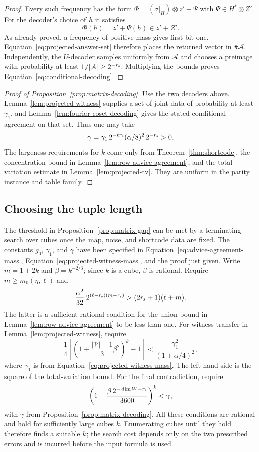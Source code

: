 \begin{proof}
Every such frequency has the form
$\Phi=(\sigma|_H)\otimes z'+\Psi$ with $\Psi\in H^*\otimes Z'$.
For the decoder's choice of $h$ it satisfies
\[
 \Phi(h)=z'+\Psi(h)\in z'+Z'.
\]
As already proved, a frequency of positive mass gives first bit one.
Equation~\eqref{eq:projected-answer-set} therefore places the returned
vector in $\bar\pi\mathcal A$.  Independently, the $U$-decoder samples
uniformly from $\mathcal A$ and chooses a preimage with probability at
least $1/|\mathcal A|\ge2^{-r_{\rm s}}$.  Multiplying the bounds proves
Equation~\eqref{eq:conditional-decoding}.
\end{proof}

\begin{proof}[Proof of Proposition~\ref{prop:matrix-decoding}]
Use the two decoders above.  Lemma~\ref{lem:projected-witness} supplies a
set of joint data of probability at least $\gamma_1$, and
Lemma~\ref{lem:fourier-coset-decoding} gives the stated conditional
agreement on that set.  Thus one may take
\[
 \gamma=\gamma_1\,2^{-\ell r_{\rm s}}(\alpha/8)^2\,2^{-r_{\rm s}}>0.
\]
The largeness requirements for $k$ come only from
Theorem~\ref{thm:shortcode}, the concentration bound in
Lemma~\ref{lem:row-advice-agreement}, and the total variation estimate in
Lemma~\ref{lem:projected-tv}.  They are uniform in the parity instance
and table family.
\end{proof}

\subsection{Choosing the tuple length}\label{subsec:effective-k}

The threshold in Proposition~\ref{prop:matrix-gap} can be met by a
terminating search over cubes once the map, noise, and shortcode data are fixed.
The constants $g_0$, $\gamma_1$, and $\gamma$ have been specified in
Equation~\eqref{eq:advice-agreement-mass},
Equation~\eqref{eq:projected-witness-mass}, and the proof just given.
Write $m=1+2k$ and $\beta=k^{-2/3}$; since $k$ is a cube, $\beta$ is
rational.  Require $m\ge m_0(\eta,\ell)$ and
\[
 \frac{\alpha^2}{32}\,2^{(\ell-r_{\rm s})(m-r_{\rm s})}
 >(2r_{\rm s}+1)(\ell+m).
\]
The latter is a sufficient rational condition for the union bound in
Lemma~\ref{lem:row-advice-agreement} to be less than one.  For witness
transfer in Lemma~\ref{lem:projected-witness}, require
\[
 \frac14\left[
 \left(1+\frac{|\mathcal V|-1}{3}\beta^2\right)^k-1\right]
 <\frac{\gamma_1^2}{(1+\alpha/4)^2},
\]
where $\gamma_1$ is from
Equation~\eqref{eq:projected-witness-mass}.  The left-hand side is the
square of the total-variation bound.  For the final contradiction,
require
\[
 \left(1-\frac{\beta\,2^{-\dim W-r_{\rm s}}}{3600}\right)^k
 <\gamma,
\]
with $\gamma$ from Proposition~\ref{prop:matrix-decoding}.  All these
conditions are rational and hold for sufficiently large cubes $k$.
Enumerating cubes until they hold therefore finds a suitable $k$;
the search cost depends only on the two prescribed errors and is
incurred before the input formula is used.

